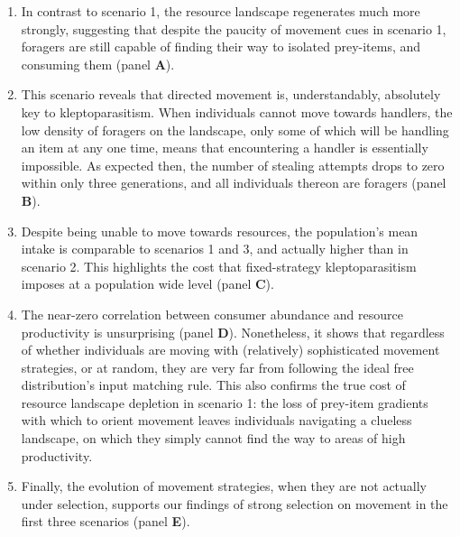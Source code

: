 \documentclass[]{article}
\begin{document}
\begin{enumerate}
\def\labelenumi{\arabic{enumi}.}
\item
  In contrast to scenario 1, the resource landscape regenerates much more strongly, suggesting that despite the paucity of movement cues in scenario 1, foragers are still capable of finding their way to isolated prey-items, and consuming them (panel \textbf{A}).
\item
  This scenario reveals that directed movement is, understandably, absolutely key to kleptoparasitism.
  When individuals cannot move towards handlers, the low density of foragers on the landscape, only some of which will be handling an item at any one time, means that encountering a handler is essentially impossible.
  As expected then, the number of stealing attempts drops to zero within only three generations, and all individuals thereon are foragers (panel \textbf{B}).
\item
  Despite being unable to move towards resources, the population's mean intake is comparable to scenarios 1 and 3, and actually higher than in scenario 2.
  This highlights the cost that fixed-strategy kleptoparasitism imposes at a population wide level (panel \textbf{C}).
\item
  The near-zero correlation between consumer abundance and resource productivity is unsurprising (panel \textbf{D}).
  Nonetheless, it shows that regardless of whether individuals are moving with (relatively) sophisticated movement strategies, or at random, they are very far from following the ideal free distribution's input matching rule.
  This also confirms the true cost of resource landscape depletion in scenario 1: the loss of prey-item gradients with which to orient movement leaves individuals navigating a clueless landscape, on which they simply cannot find the way to areas of high productivity.
\item
  Finally, the evolution of movement strategies, when they are not actually under selection, supports our findings of strong selection on movement in the first three scenarios (panel \textbf{E}).
\end{enumerate}
\end{document}
